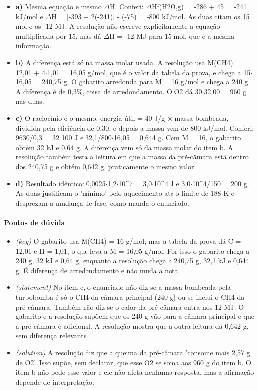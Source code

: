 \documentclass{article}%
\begin{document}
\begin{itemize}%
\item%
\textbf{a)} Mesma equação e mesmo $\Delta$H. Conferi: $\Delta$Hf(H2O,g) = -286 + 45 = -241 kJ/mol e $\Delta$H = {[}-393 + 2(-241){]} - (-75) = -800 kJ/mol. As duas citam os 15 mol e os -12 MJ. A resolução não escreve explicitamente a equação multiplicada por 15, mas dá $\Delta$H = -12 MJ para 15 mol, que é a mesma informação.%
\item%
\textbf{b)} A diferença está só na massa molar usada. A resolução usa M(CH4) = 12,01 + 4$\cdot$1,01 = 16,05 g/mol, que é o valor da tabela da prova, e chega a 15$\cdot$16,05 = 240,75 g. O gabarito arredonda para M = 16 g/mol e chega a 240 g. A diferença é de 0,3\%, coisa de arredondamento. O O2 dá 30$\cdot$32,00 = 960 g nas duas.%
\item%
\textbf{c)} O raciocínio é o mesmo: energia útil = 40 J/g $\times$ massa bombeada, dividida pela eficiência de 0,30, e depois a massa vem de 800 kJ/mol. Conferi: 9630/0,3 = 32 100 J e 32,1/800$\cdot$16,05 = 0,644 g. Com M = 16, o gabarito obtém 32 kJ e 0,64 g. A diferença vem só da massa molar do item b. A resolução também testa a leitura em que a massa da pré{-}câmara está dentro dos 240,75 g e obtém 0,642 g, praticamente o mesmo valor.%
\item%
\textbf{d)} Resultado idêntico: 0,0025$\cdot$1,2$\cdot$10\^{}7 = 3,0$\cdot$10\^{}4 J e 3,0$\cdot$10\^{}4/150 = 200 g. As duas justificam o 'mínimo' pelo aquecimento até o limite de 188 K e desprezam a mudança de fase, como manda o enunciado.%
\end{itemize}%
\paragraph{Pontos de dúvida}%
\begin{itemize}%
\item%
\textit{(key)} O gabarito usa M(CH4) = 16 g/mol, mas a tabela da prova dá C = 12,01 e H = 1,01, o que leva a M = 16,05 g/mol. Por isso o gabarito chega a 240 g, 32 kJ e 0,64 g, enquanto a resolução chega a 240,75 g, 32,1 kJ e 0,644 g. É diferença de arredondamento e não muda a nota.%
\item%
\textit{(statement)} No item c, o enunciado não diz se a massa bombeada pela turbobomba é só o CH4 da câmara principal (240 g) ou se inclui o CH4 da pré{-}câmara. Também não diz se o calor da pré{-}câmara entra nos 12 MJ. O gabarito e a resolução supõem que os 240 g vão para a câmara principal e que a pré{-}câmara é adicional. A resolução mostra que a outra leitura dá 0,642 g, sem diferença relevante.%
\item%
\textit{(solution)} A resolução diz que a queima da pré{-}câmara 'consome mais 2,57 g de O2'. Isso supõe, sem declarar, que esse O2 se soma aos 960 g do item b. O item b não pede esse valor e ele não afeta nenhuma resposta, mas a afirmação depende de interpretação.%
\end{itemize}%
\end{document}
